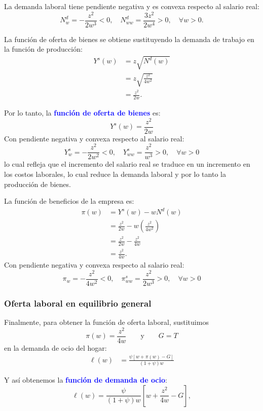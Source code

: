 \documentclass[11pt]{article}
\begin{document}
La demanda laboral tiene pendiente negativa y es convexa respecto al salario real:
$$
N^d_w = -\frac{z^2}{2w^3}<0, \quad N^d_{ww} = \frac{3z^2}{2w^4}>0, \quad \forall w>0.
$$

La función de oferta de bienes se obtiene sustituyendo la demanda de trabajo en la función de producción:
\begin{align*}
Y^s(w)
&=z\sqrt{N^d(w)}\\
&=z\sqrt{\frac{z^2}{4w^2}}\\
&=
\frac{z^2}{2w}.
\end{align*}

Por lo tanto, la \textcolor{blue}{\textbf{función de oferta de bienes}} es:
\begin{equation}
  \boxed{Y^s(w) = 
  \frac{z^2}{2w} \label{eq:Y_s}
  }
\end{equation}
Con pendiente negativa y convexa respecto al salario real:
\[
Y^s_w
=
-\frac{z^2}{2w^2}<0, \quad Y^s_{ww} = \frac{z^2}{w^3}>0, \quad \forall w>0
\]
lo cual refleja que el incremento del salario real se traduce en un incremento en los costos laborales, lo cual reduce la demanda laboral y por lo tanto la producción de bienes.


La función de beneficios de la empresa es:
\begin{align*}
\pi(w)
&=Y^s(w)-wN^d(w)\\
&=\frac{z^2}{2w}
-w\left(\frac{z^2}{4w^2}\right)\\
&=\frac{z^2}{2w}-\frac{z^2}{4w}\\
&=
\boxed{
\frac{z^2}{4w}
}.
\end{align*}
Con pendiente negativa y convexa respecto al salario real:
\[
\pi_w
=
-\frac{z^2}{4w^2}<0, \quad \pi^s_{ww} = \frac{z^2}{2w^3}>0, \quad \forall w>0
\]

\subsubsection*{Oferta laboral en equilibrio general}

Finalmente, para obtener la función de oferta laboral, sustituimos
\[
\pi(w)=\frac{z^2}{4w}
\qquad\text{y}\qquad
G = T
\]
en la demanda de ocio del hogar:
\begin{align*}
\ell(w)
&=
\frac{\psi\left[w+\pi(w)-G\right]}
     {(1+\psi)w}
\end{align*}

Y así obtenemos la \textcolor{blue}{\textbf{función de demanda de ocio}}:
\begin{equation}
  \boxed{\ell(w) = 
  \frac{\psi}{(1+\psi)w}\left[w+\dfrac{z^2}{4w}-G \right]
},
\end{equation}
\end{document}
